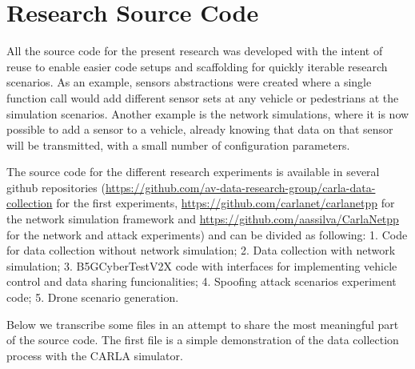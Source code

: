 \chapter{Research Source Code}

All the source code for the present research was developed with the intent of reuse to enable easier code setups and scaffolding for quickly iterable research scenarios. As an example, sensors abstractions were created where a single function call would add different sensor sets at any vehicle or pedestrians at the simulation scenarios. Another example is the network simulations, where it is now possible to add a sensor to a vehicle, already knowing that data on that sensor will be transmitted, with a small number of configuration parameters.

The source code for the different research experiments is available in several github repositories (\url{https://github.com/av-data-research-group/carla-data-collection} for the first experiments, \url{https://github.com/carlanet/carlanetpp} for the network simulation framework and \url{https://github.com/aassilva/CarlaNetpp} for the network and attack experiments) and can be divided as following: 1. Code for data collection without network simulation; 2. Data collection with network simulation; 3. B5GCyberTestV2X code with interfaces for implementing vehicle control and data sharing funcionalities; 4. Spoofing attack scenarios experiment code; 5. Drone scenario generation.

Below we transcribe some files in an attempt to share the most meaningful part of the source code. The first file is a simple demonstration of the data collection process with the CARLA simulator.


